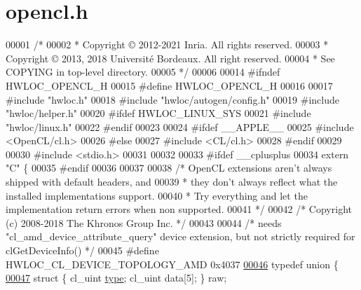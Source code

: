 \hypertarget{a00149_source}{}\section{opencl.\+h}
\label{a00149_source}

\begin{DoxyCode}
00001 \textcolor{comment}{/*}
00002 \textcolor{comment}{ * Copyright © 2012-2021 Inria.  All rights reserved.}
00003 \textcolor{comment}{ * Copyright © 2013, 2018 Université Bordeaux.  All right reserved.}
00004 \textcolor{comment}{ * See COPYING in top-level directory.}
00005 \textcolor{comment}{ */}
00006 
00014 \textcolor{preprocessor}{#ifndef HWLOC\_OPENCL\_H}
00015 \textcolor{preprocessor}{#define HWLOC\_OPENCL\_H}
00016 
00017 \textcolor{preprocessor}{#include "hwloc.h"}
00018 \textcolor{preprocessor}{#include "hwloc/autogen/config.h"}
00019 \textcolor{preprocessor}{#include "hwloc/helper.h"}
00020 \textcolor{preprocessor}{#ifdef HWLOC\_LINUX\_SYS}
00021 \textcolor{preprocessor}{#include "hwloc/linux.h"}
00022 \textcolor{preprocessor}{#endif}
00023 
00024 \textcolor{preprocessor}{#ifdef \_\_APPLE\_\_}
00025 \textcolor{preprocessor}{#include <OpenCL/cl.h>}
00026 \textcolor{preprocessor}{#else}
00027 \textcolor{preprocessor}{#include <CL/cl.h>}
00028 \textcolor{preprocessor}{#endif}
00029 
00030 \textcolor{preprocessor}{#include <stdio.h>}
00031 
00032 
00033 \textcolor{preprocessor}{#ifdef \_\_cplusplus}
00034 \textcolor{keyword}{extern} \textcolor{stringliteral}{"C"} \{
00035 \textcolor{preprocessor}{#endif}
00036 
00037 
00038 \textcolor{comment}{/* OpenCL extensions aren't always shipped with default headers, and}
00039 \textcolor{comment}{ * they don't always reflect what the installed implementations support.}
00040 \textcolor{comment}{ * Try everything and let the implementation return errors when non supported.}
00041 \textcolor{comment}{ */}
00042 \textcolor{comment}{/* Copyright (c) 2008-2018 The Khronos Group Inc. */}
00043 
00044 \textcolor{comment}{/* needs "cl\_amd\_device\_attribute\_query" device extension, but not strictly required for clGetDeviceInfo() 
      */}
00045 \textcolor{preprocessor}{#define HWLOC\_CL\_DEVICE\_TOPOLOGY\_AMD 0x4037}
\hyperlink{a00322}{00046} \textcolor{keyword}{typedef} \textcolor{keyword}{union }\{
\hyperlink{a00322_a8ec4ea89b862bb271845b48063f332b4}{00047}     \textcolor{keyword}{struct }\{ cl\_uint \hyperlink{a00322_a8ec4ea89b862bb271845b48063f332b4}{type}; cl\_uint data[5]; \} raw;

\end{DoxyCode}

